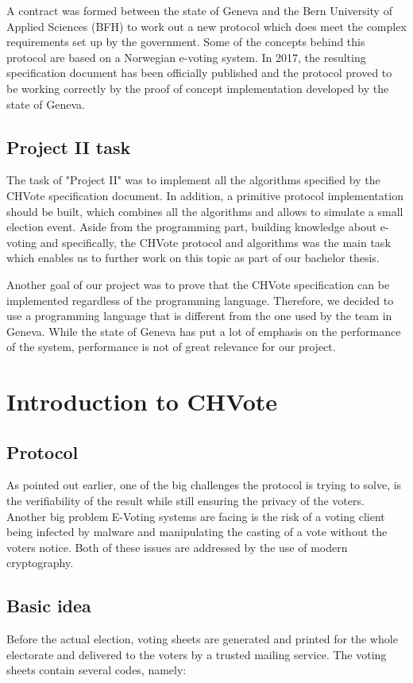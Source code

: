 \documentclass[a4paper,12pt]{report}
\begin{document}
A contract was formed between the state of Geneva and the Bern University of Applied Sciences (BFH) to work out a new protocol which does meet the complex requirements set up by the government. Some of the concepts behind this protocol are based on a Norwegian e-voting system. In 2017, the resulting specification document has been officially published and the protocol proved to be working correctly by the proof of concept implementation developed by the state of Geneva.

\section{Project II task}
The task of "Project II" was to implement all the algorithms specified by the CHVote specification document. In addition, a primitive protocol implementation should be built, which combines all the algorithms and allows to simulate a small election event. Aside from the programming part, building knowledge about e-voting and specifically, the CHVote protocol and algorithms was the main task which enables us to further work on this topic as part of our bachelor thesis.

Another goal of our project was to prove that the CHVote specification can be implemented regardless of the programming language. Therefore, we decided to use a programming language that is different from the one used by the team in Geneva. While the state of Geneva has put a lot of emphasis on the performance of the system, performance is not of great relevance for our project.

\chapter{Introduction to CHVote}
\section{Protocol}
As pointed out earlier, one of the big challenges the protocol is trying to solve, is the verifiability of the result while still ensuring the privacy of the voters. Another big problem E-Voting systems are facing is the risk of a voting client being infected by malware and manipulating the casting of a vote without the voters notice. Both of these issues are addressed by the use of modern cryptography.

\section{Basic idea}
Before the actual election, voting sheets are generated and printed for the whole electorate and delivered to the voters by a trusted mailing service. The voting sheets contain several codes, namely:
\end{document}
